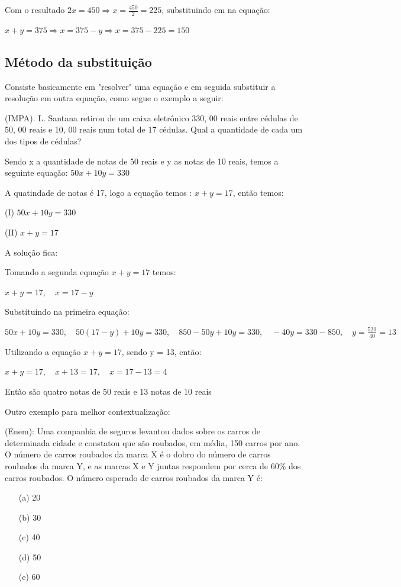 \begin{multicols*}{2}
\begin{figure}[H]
\begin{tikzpicture}[x=0.75pt,y=0.75pt,yscale=-1,xscale=1]
    \end{tikzpicture}
    \end{figure}

    Com o resultado $2x = 450 \Rightarrow x = \frac{450}{2} = 225$, substituindo em na equação:

    $x+y = 375 \Rightarrow x = 375 - y \Rightarrow x = 375 - 225 = 150$

    \subsection*{Método da substituição}
    Consiste basicamente em "resolver" uma equação e em seguida substituir a resolução em outra 			equação, como segue o exemplo a seguir:

    (IMPA). L. Santana retirou de um caixa eletrônico 330, 00 reais entre cédulas de 50, 00 reais e 		10, 00 reais num total de 17 cédulas. Qual a quantidade de cada um dos tipos de cédulas?

    Sendo x a quantidade de notas de 50 reais e y as notas de 10 reais, temos a seguinte equação:
    $50x + 10y = 330$

    A quatindade de notas é 17, logo a equação temos : $x + y = 17$, então temos:

    (I) $50x + 10y = 330$

    (II) $x + y = 17$

    A solução fica:

    Tomando a segunda equação $x + y = 17$ temos:

    $x + y = 17, \quad x = 17 - y$

    Substituindo na primeira equação:

    $50x + 10y = 330, \quad 50(17 - y) + 10y = 330, \quad 850 - 50y + 10y = 330, \quad
        -40y = 330 - 850, \quad y = \frac{520}{40} = 13$

    Utilizando a equação $x + y = 17$, sendo y = 13, então:

    $x + y = 17, \quad x + 13 = 17, \quad x = 17 - 13 = 4$

    Então são quatro notas de 50 reais e 13 notas de 10 reais

    Outro exemplo para melhor contextualização:

    (Enem): Uma companhia de seguros levantou dados sobre os carros de determinada cidade e 				constatou que são roubados, em média, 150 carros por ano. O número de carros roubados da marca 			X é o dobro do número de carros roubados da marca Y, e as marcas X e Y juntas respondem por 			cerca de 60\% dos carros roubados. O número esperado de carros roubados da marca Y é:
    \begin{itemize}
        \item[(a)] 20
        \item[(b)] 30
        \item[(c)] 40
        \item[(d)] 50
        \item[(e)] 60
    \end{itemize}


\end{multicols*}
